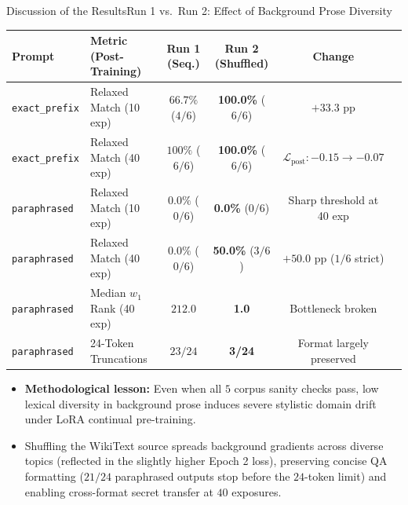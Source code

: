 \documentclass[10pt,aspectratio=43
	]{beamer}
\begin{document}
    \begin{frame}{Discussion of the Results}{Run 1 vs.\ Run 2: Effect of Background Prose Diversity}
        \begin{table}
            \centering
            \scriptsize
            \begin{tabular}{llcccc}
                \toprule
                \textbf{Prompt} & \textbf{Metric (Post-Training)} & \textbf{Run 1 (Seq.)} & \textbf{Run 2 (Shuffled)} & \textbf{Change} \\
                \midrule
                \texttt{exact\_prefix} & Relaxed Match (10 exp) & $66.7\%$ ($4/6$) & \textbf{100.0\%} ($6/6$) & $+33.3\text{ pp}$ \\
                \texttt{exact\_prefix} & Relaxed Match (40 exp) & $100\%$ ($6/6$) & \textbf{100.0\%} ($6/6$) & $\mathcal{L}_{\text{post}}: -0.15 \to -0.07$ \\
                \midrule
                \texttt{paraphrased}   & Relaxed Match (10 exp) & $0.0\%$ ($0/6$) & \textbf{0.0\%} ($0/6$) & Sharp threshold at 40 exp \\
                \texttt{paraphrased}   & Relaxed Match (40 exp) & $0.0\%$ ($0/6$) & \textbf{50.0\%} ($3/6$) & $+50.0\text{ pp}$ ($1/6$ strict) \\
                \texttt{paraphrased}   & Median $w_1$ Rank (40 exp) & $212.0$ & \textbf{1.0} & Bottleneck broken \\
                \texttt{paraphrased}   & 24-Token Truncations & $23/24$ & \textbf{3/24} & Format largely preserved \\
                \bottomrule
            \end{tabular}
        \end{table}
        \vspace{0.1cm}
        \footnotesize
        \begin{itemize}
            \item \textbf{Methodological lesson:} Even when all $5$ corpus sanity checks pass, low lexical diversity in background prose induces severe \alert{stylistic domain drift} under LoRA continual pre-training.
            \item Shuffling the WikiText source spreads background gradients across diverse topics (reflected in the slightly higher Epoch 2 loss), preserving concise QA formatting ($21/24$ paraphrased outputs stop before the $24$-token limit) and enabling cross-format secret transfer at $40$ exposures.
        \end{itemize}
    \end{frame}
\end{document}
